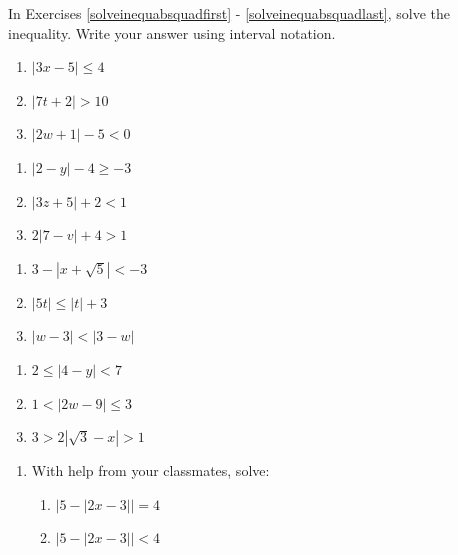 \documentclass[11pt]{article}
\theoremstyle{definition}  %
\newcounter{HW}
\begin{document}
In Exercises \ref{solveinequabsquadfirst} - \ref{solveinequabsquadlast}, solve the inequality.  Write your answer using interval notation. 

\begin{multicols}{3}
\begin{enumerate}
\setcounter{enumi}{\value{HW}}
\item $|3x - 5| \leq 4$ \label{solveinequabsquadfirst}
\item $|7t + 2| > 10$
\item $|2w+1| - 5 < 0$   
\setcounter{HW}{\value{enumi}}
\end{enumerate}
\end{multicols}

\begin{multicols}{3}
\begin{enumerate}
\setcounter{enumi}{\value{HW}}


\item $|2-y| - 4 \geq -3$
\item $|3z+5| + 2 < 1$   
\item $2|7-v| +4 > 1$

\setcounter{HW}{\value{enumi}}
\end{enumerate}
\end{multicols}

\begin{multicols}{3}
\begin{enumerate}
\setcounter{enumi}{\value{HW}}


\item $3 - |x+\sqrt{5}| < -3$
\item $|5t| \leq |t|+3$   
\item $|w-3| < |3-w|$

\setcounter{HW}{\value{enumi}}
\end{enumerate}
\end{multicols}

\begin{multicols}{3}
\begin{enumerate}
\setcounter{enumi}{\value{HW}}

\item  $2 \leq |4-y| < 7$ 
\item $1 < |2w - 9| \leq 3$ 
\item  $3 > 2|\sqrt{3} - x| > 1$ \label{solveinequabsquadlast}
\setcounter{HW}{\value{enumi}}
\end{enumerate}
\end{multicols}

\begin{enumerate}
\setcounter{enumi}{\value{HW}}
\item  With help from your classmates, solve:
\begin{enumerate}
\item  $|5 - |2x-3|| = 4$
\item   $|5 - |2x-3|| < 4$
 
\end{enumerate}

\end{enumerate}
\end{document}
